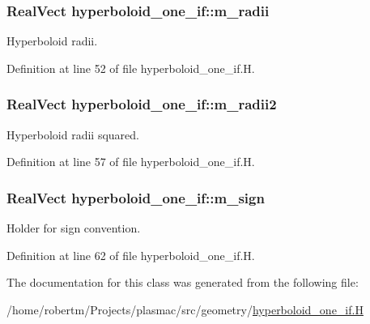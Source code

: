 \subsubsection[{\texorpdfstring{m\+\_\+radii}{m_radii}}]{\setlength{\rightskip}{0pt plus 5cm}Real\+Vect hyperboloid\+\_\+one\+\_\+if\+::m\+\_\+radii\hspace{0.3cm}{\ttfamily [protected]}}\hypertarget{classhyperboloid__one__if_a9f55aa33c7af9234af8152a3123a4c11}{}\label{classhyperboloid__one__if_a9f55aa33c7af9234af8152a3123a4c11}


Hyperboloid radii. 



Definition at line 52 of file hyperboloid\+\_\+one\+\_\+if.\+H.

\subsubsection[{\texorpdfstring{m\+\_\+radii2}{m_radii2}}]{\setlength{\rightskip}{0pt plus 5cm}Real\+Vect hyperboloid\+\_\+one\+\_\+if\+::m\+\_\+radii2\hspace{0.3cm}{\ttfamily [protected]}}\hypertarget{classhyperboloid__one__if_ad46f70b1af15a70c719887a043df653a}{}\label{classhyperboloid__one__if_ad46f70b1af15a70c719887a043df653a}


Hyperboloid radii squared. 



Definition at line 57 of file hyperboloid\+\_\+one\+\_\+if.\+H.

\subsubsection[{\texorpdfstring{m\+\_\+sign}{m_sign}}]{\setlength{\rightskip}{0pt plus 5cm}Real\+Vect hyperboloid\+\_\+one\+\_\+if\+::m\+\_\+sign\hspace{0.3cm}{\ttfamily [protected]}}\hypertarget{classhyperboloid__one__if_a72d14f7592fbfbc57258d98b4fe650cf}{}\label{classhyperboloid__one__if_a72d14f7592fbfbc57258d98b4fe650cf}


Holder for sign convention. 



Definition at line 62 of file hyperboloid\+\_\+one\+\_\+if.\+H.



The documentation for this class was generated from the following file\+:\begin{DoxyCompactItemize}
\item 
/home/robertm/\+Projects/plasmac/src/geometry/\hyperlink{hyperboloid__one__if_8H}{hyperboloid\+\_\+one\+\_\+if.\+H}\end{DoxyCompactItemize}
